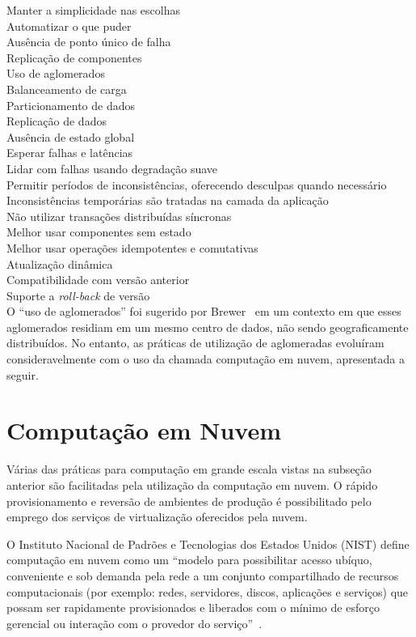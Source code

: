 Manter a simplicidade nas escolhas \\
Automatizar o que puder \\
Ausência de ponto único de falha \\
Replicação de componentes \\
Uso de aglomerados \\
Balanceamento de carga \\
Particionamento de dados \\
Replicação de dados \\
Ausência de estado global  \\%
Esperar falhas e latências  \\
Lidar com falhas usando degradação suave \\
Permitir períodos de inconsistências, oferecendo desculpas quando necessário \\
Inconsistências temporárias são tratadas na camada da aplicação \\
Não utilizar transações distribuídas síncronas \\
Melhor usar componentes sem estado  \\%
Melhor usar operações idempotentes e comutativas \\
Atualização dinâmica \\
Compatibilidade com versão anterior \\
Suporte a \emph{roll-back} de versão \\

O ``uso de aglomerados'' foi sugerido por Brewer~\cite{Brewer2001GiantScale} em um contexto em que esses aglomerados residiam em um mesmo centro de dados, não sendo geograficamente distribuídos. No entanto, as práticas de utilização de aglomeradas evoluíram consideravelmente com o uso da chamada computação em nuvem, apresentada a seguir.

\section{Computação em Nuvem}

Várias das práticas para computação em grande escala vistas na subseção anterior são facilitadas pela utilização da computação em nuvem. O rápido provisionamento e reversão de ambientes de produção é possibilitado pelo emprego dos serviços de virtualização oferecidos pela nuvem.

O Instituto Nacional de Padrões e Tecnologias dos Estados Unidos (NIST) define computação em nuvem como um ``modelo para possibilitar acesso ubíquo, conveniente e sob demanda pela rede a um conjunto compartilhado de recursos computacionais (por exemplo: redes, servidores, discos, aplicações e serviços) que possam ser rapidamente provisionados e liberados com o mínimo de esforço gerencial ou interação com o provedor do serviço''~\cite{Nist2011Cloud}. 

